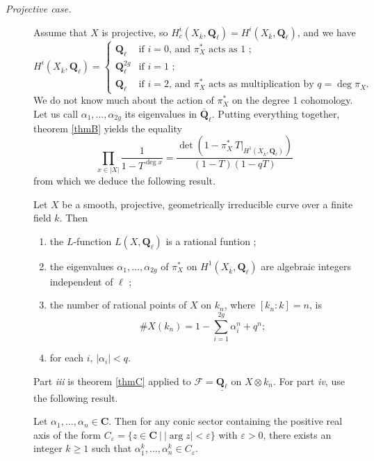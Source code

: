 \begin{description} 
\item[\it Projective case.]
Assume that $X$ is projective, so $H_c^i(X_{\bar k}, \mathbf{Q}_\ell) = 
H^i(X_{\bar k}, \mathbf{Q}_\ell)$, and we have
$$ 
H^i(X_{\bar k}, \mathbf{Q}_\ell) =
\left\{\begin{array}{ll}
\mathbf{Q}_\ell & \text{if $i = 0$, and $\pi_X^*$ acts as 1 ;} \\
\mathbf{Q}_\ell^{2g} & \text{if $i = 1$ ;} \\
\mathbf{Q}_\ell & \text{if $i = 2$, and $\pi_X^*$ acts as multiplication by 
$q=\deg \pi_X$.} 
\end{array}\right.
$$
We do not know much about the action of $\pi_X^*$ on the degree 1 cohomology. 
Let us call $\alpha_1, \ldots, \alpha_{2g}$ its eigenvalues in 
$\bar{\mathbf{Q}}_\ell$. Putting everything together, theorem \ref{thmB} yields 
the equality
$$
\prod_{x\in |X|} \frac{1}{1-T^{\deg x}} = \frac{\det\left(1- \pi_X^*\ 
T\big|_{H^1(X_{\bar k}, \mathbf{Q}_\ell)}\right)}{(1-T)(1-qT)}
$$
from which we deduce the following result.

\begin{lemma}
Let $X$ be a smooth, projective, geometrically irreducible curve over a finite 
field $k$. Then
\begin{enumerate}
\item the $L$-function $L(X, \mathbf{Q}_\ell)$ is a rational funtion ;
\item the eigenvalues $\alpha_1, \ldots, \alpha_{2g}$ of $\pi_X^*$ on 
$H^1(X_{\bar k}, \mathbf{Q}_\ell)$ are algebraic integers independent of $\ell$ 
;
\item the number of rational points of $X$ on $k_n$, where $[k_n: k] = n$, is  
$$
\# X(k_n) = 1-\sum_{i=1}^{2g}\alpha_i^n +q^n ; 
$$ 
\item 
for each $i$, $|\alpha_i| < q$. 
\end{enumerate}
\end{lemma}	

Part {\it iii} is theorem \ref{thmC} applied to $\mathcal{F} = 
\underline{\mathbf{Q}_\ell}$ on $X\otimes k_n$. For part {\it iv}, use the 
following result.
\begin{exercise}
Let $\alpha_1, \dots, \alpha_n \in \mathbf{C}$. Then for any conic sector 
containing the positive real axis of the form $C_\varepsilon = \{ z \in 
\mathbf{C} \ | \ |\arg z| < \varepsilon \}$ with $\varepsilon >0$, there exists 
an integer $k \geq 1$ such that $\alpha_1^k, \dots, \alpha_n^k \in 
C_\varepsilon$.
\end{exercise}


\end{description}
